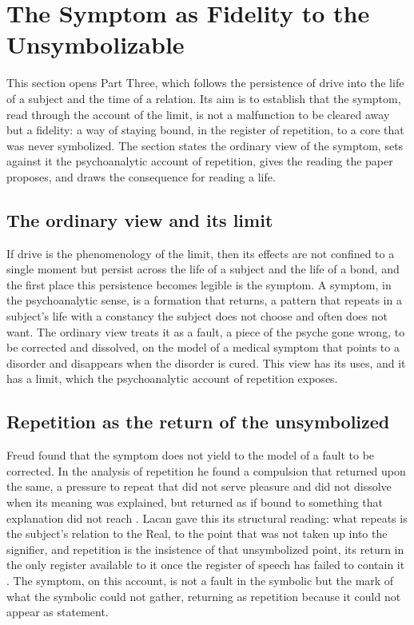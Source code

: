 \section{The Symptom as Fidelity to the Unsymbolizable}
\label{p26:sec:inscription}

\noindent
This section opens Part Three, which follows the persistence of drive into the life of a subject and the time of a relation. Its aim is to establish that the symptom, read through the account of the limit, is not a malfunction to be cleared away but a fidelity: a way of staying bound, in the register of repetition, to a core that was never symbolized. The section states the ordinary view of the symptom, sets against it the psychoanalytic account of repetition, gives the reading the paper proposes, and draws the consequence for reading a life.

\subsection*{The ordinary view and its limit}

If drive is the phenomenology of the limit, then its effects are not confined to a single moment but persist across the life of a subject and the life of a bond, and the first place this persistence becomes legible is the symptom. A symptom, in the psychoanalytic sense, is a formation that returns, a pattern that repeats in a subject's life with a constancy the subject does not choose and often does not want. The ordinary view treats it as a fault, a piece of the psyche gone wrong, to be corrected and dissolved, on the model of a medical symptom that points to a disorder and disappears when the disorder is cured. This view has its uses, and it has a limit, which the psychoanalytic account of repetition exposes.

\subsection*{Repetition as the return of the unsymbolized}

Freud found that the symptom does not yield to the model of a fault to be corrected. In the analysis of repetition he found a compulsion that returned upon the same, a pressure to repeat that did not serve pleasure and did not dissolve when its meaning was explained, but returned as if bound to something that explanation did not reach \parencite{freud1920beyond}. Lacan gave this its structural reading: what repeats is the subject's relation to the Real, to the point that was not taken up into the signifier, and repetition is the insistence of that unsymbolized point, its return in the only register available to it once the register of speech has failed to contain it \parencite{lacan1977xi}. The symptom, on this account, is not a fault in the symbolic but the mark of what the symbolic could not gather, returning as repetition because it could not appear as statement.

